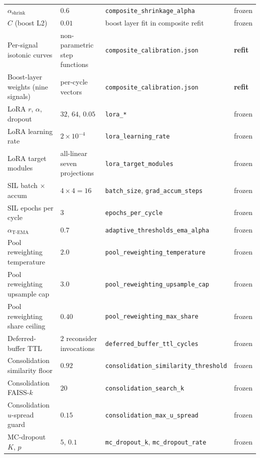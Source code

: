 {\begin{longtable}{@{}p{4.0cm}p{3.8cm}p{4.0cm}p{2.6cm}@{}}
$\alpha_{\text{shrink}}$             & $0.6$  & \texttt{composite\_\allowbreak shrinkage\_alpha} & frozen \\
$C$ (boost L2)                       & $0.01$ & boost layer fit in composite refit & frozen \\
Per-signal isotonic curves           & non-parametric step functions & \texttt{composite\_\allowbreak calibration.json} & \textbf{refit} \\
Boost-layer weights (nine signals)   & per-cycle vectors      & \texttt{composite\_\allowbreak calibration.json} & \textbf{refit} \\
LoRA $r$, $\alpha$, dropout          & $32$, $64$, $0.05$ & \texttt{lora\_*} & frozen \\
LoRA learning rate                   & $2 \times 10^{-4}$ & \texttt{lora\_learning\_rate} & frozen \\
LoRA target modules                  & all-linear seven projections & \texttt{lora\_target\_modules} & frozen \\
SIL batch $\times$ accum             & $4 \times 4 = 16$ & \texttt{batch\_size},\allowbreak{} \texttt{grad\_accum\_steps} & frozen \\
SIL epochs per cycle                 & $3$ & \texttt{epochs\_per\_cycle} & frozen \\
$\alpha_{\text{T-EMA}}$              & $0.7$ & \texttt{adaptive\_thresholds\_\allowbreak ema\_alpha} & frozen \\
Pool reweighting temperature         & $2.0$ & \texttt{pool\_reweighting\_\allowbreak temperature} & frozen \\
Pool reweighting upsample cap        & $3.0$ & \texttt{pool\_reweighting\_\allowbreak upsample\_cap} & frozen \\
Pool reweighting share ceiling       & $0.40$ & \texttt{pool\_reweighting\_\allowbreak max\_share} & frozen \\
Deferred-buffer TTL                  & $2$ reconsider invocations & \texttt{deferred\_buffer\_\allowbreak ttl\_cycles} & frozen \\
Consolidation similarity floor       & $0.92$ & \texttt{consolidation\_\allowbreak similarity\_threshold} & frozen \\
Consolidation FAISS-$k$              & $20$ & \texttt{consolidation\_\allowbreak search\_k} & frozen \\
Consolidation $u$-spread guard       & $0.15$ & \texttt{consolidation\_\allowbreak max\_u\_spread} & frozen \\
MC-dropout $K$, $p$                  & $5$, $0.1$ & \texttt{mc\_dropout\_k},\allowbreak{} \texttt{mc\_dropout\_rate} & frozen \\

\end{longtable}}
